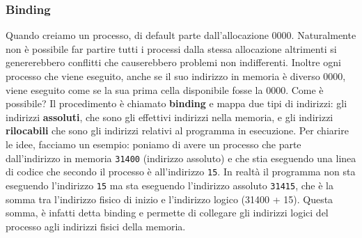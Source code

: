 % 
\subsubsection{Binding}
Quando creiamo un processo, di default parte dall'allocazione 0000. Naturalmente non è possibile far partire tutti i processi dalla stessa allocazione altrimenti si genererebbero conflitti che causerebbero problemi non indifferenti. Inoltre ogni processo che viene eseguito, anche se il suo indirizzo in memoria è diverso 0000, viene eseguito come se la sua prima cella disponibile fosse la 0000. Come è possibile? Il procedimento è chiamato \textbf{binding} e mappa due tipi di indirizzi: gli indirizzi \textbf{assoluti}, che sono gli effettivi indirizzi nella memoria, e gli indirizzi \textbf{rilocabili} che sono gli indirizzi relativi al programma in esecuzione. Per chiarire le idee, facciamo un esempio: poniamo di avere un processo che parte dall'indirizzo in memoria \texttt{31400} (indirizzo assoluto) e che stia eseguendo una linea di codice che secondo il processo è all'indirizzo \texttt{15}. In realtà il programma non sta eseguendo l'indirizzo \texttt{15} ma sta eseguendo l'indirizzo assoluto \texttt{31415}, che è la somma tra l'indirizzo fisico di inizio e l'indirizzo logico (31400 + 15). Questa somma, è infatti detta binding e permette di collegare gli indirizzi logici del processo agli indirizzi fisici della memoria. 

